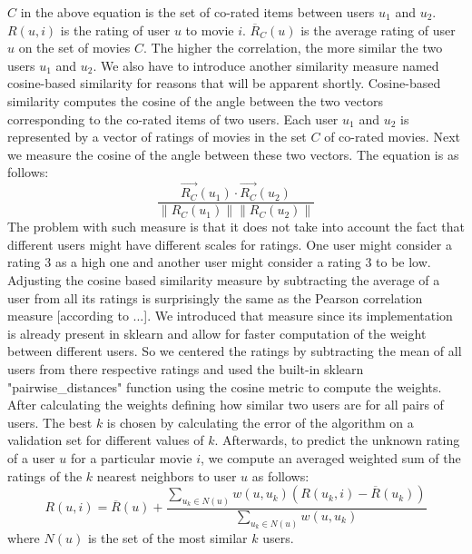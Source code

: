 \documentclass[10pt,conference,compsocconf]{IEEEtran}
\begin{document}
$C$ in the above equation is the set of co-rated items between users $u_1$ and $u_2$. $R(u,i)$ is the rating of user $u$ to movie $i$. $\overline{R}_C(u)$ is the average rating of user $u$ on the set of movies $C$. The higher the correlation, the more similar the two users $u_1$ and $u_2$. We also have to introduce another similarity measure named cosine-based similarity for reasons that will be apparent shortly. Cosine-based similarity computes the cosine of the angle between the two vectors corresponding to the co-rated items of two users. Each user $u_1$ and $u_2$ is represented by a vector of ratings of movies in the set $C$ of co-rated movies. Next we measure the cosine of the angle between these two vectors. The equation is as follows:
\begin{equation}
\frac{\overrightarrow{R_C}(u_1) \cdot {\overrightarrow{R_C}(u_2)}}{\|R_C(u_1)\| \|R_C(u_2)\|}
\end{equation}
The problem with such measure is that it does not take into account the fact that different users might have different scales for ratings. One user might consider a rating 3 as a high one and another user might consider a rating 3 to be low. Adjusting the cosine based similarity measure by subtracting the average of a user from all its ratings is surprisingly the same as the Pearson correlation measure [according to ...]. We introduced that measure since its implementation is already present in sklearn and allow for faster computation of the weight between different users. So we centered the ratings by subtracting the mean of all users from there respective ratings and used the built-in sklearn "pairwise\_distances" function using the cosine metric to compute the weights. After calculating the weights defining how similar two users are for all pairs of users. The best $k$ is chosen by calculating the error of the algorithm on a validation set for different values of $k$. Afterwards, to predict the unknown rating of a user $u$ for a particular movie $i$, we compute an averaged weighted sum of the ratings of the $k$ nearest neighbors to user $u$ as follows:
\begin{equation} \label{eqn:predict_user_based}
R(u,i) = \overline{R}(u) + \frac{\sum_{u_k \in N(u)} w(u,u_k)(R(u_k,i) - \overline{R}(u_k))}{\sum_{u_k \in N(u)} w(u,u_k)}
\end{equation}
where $N(u)$ is the set of the most similar $k$ users.
\\
\end{document}
